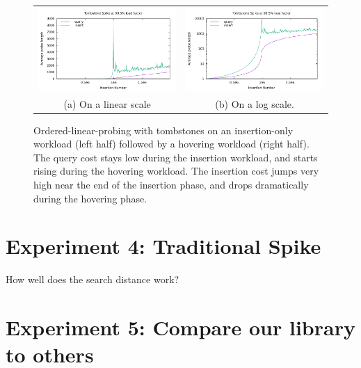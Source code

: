 \documentclass[10pt]{article}
\theoremstyle{remark}
\theoremstyle{remark}
\newcommand{\figlabel}[1]{\label{fig:#1}}
\begin{document}
\begin{figure}
\begin{center}
\begin{tabular}{cc}
  \includegraphics[width=75mm]{experiments/spike-1000000-0.995000} &
  \includegraphics[width=75mm]{experiments/spike-1000000-0.995000-log} \\
  (a) On a linear scale & (b) On a log scale.
\end{tabular}
\end{center}
\caption{Ordered-linear-probing with tombstones on an insertion-only
  workload (left half) followed by a hovering workload (right half).
  The query cost stays low during the insertion workload, and starts
  rising during the hovering workload.  The insertion cost jumps very
  high near the end of the insertion phase, and drops dramatically
  during the hovering phase.}
\figlabel{olpspike}
\end{figure}

\section{Experiment 4: Traditional Spike}

How well does the search distance work?

\section{Experiment 5: Compare our library to others}
\end{document}
